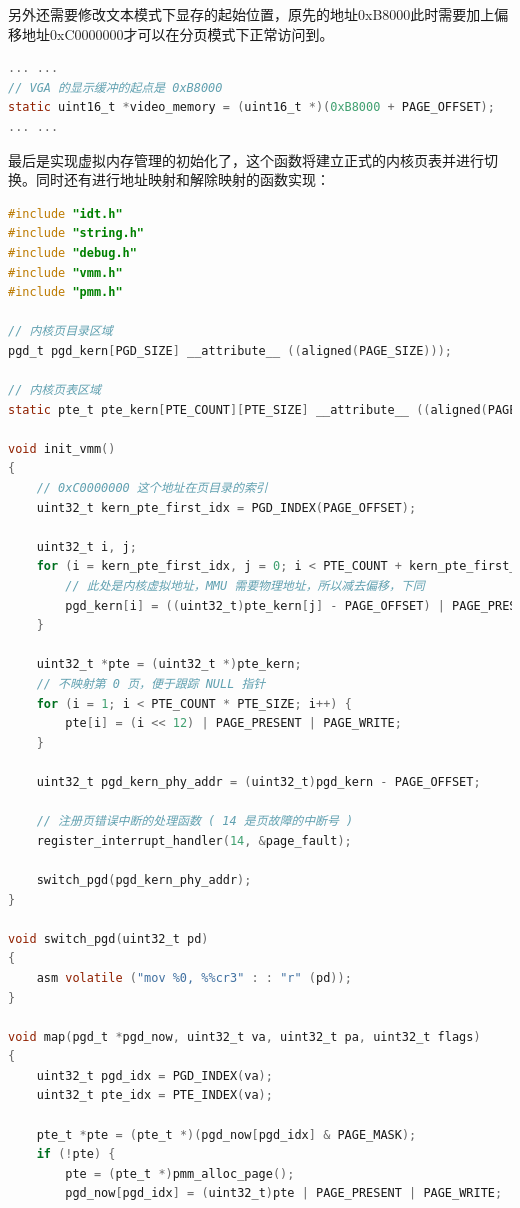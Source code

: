 \par 另外还需要修改文本模式下显存的起始位置，原先的地址0xB8000此时需要加上偏移地址0xC0000000才可以在分页模式下正常访问到。

\begin{lstlisting}[language = C, caption = drivers/console.c]
... ...
// VGA 的显示缓冲的起点是 0xB8000
static uint16_t *video_memory = (uint16_t *)(0xB8000 + PAGE_OFFSET);
... ...
\end{lstlisting}

\par 最后是实现虚拟内存管理的初始化了，这个函数将建立正式的内核页表并进行切换。同时还有进行地址映射和解除映射的函数实现：

\begin{lstlisting}[language = C, caption = mm/vmm.c]
#include "idt.h"
#include "string.h"
#include "debug.h"
#include "vmm.h"
#include "pmm.h"

// 内核页目录区域
pgd_t pgd_kern[PGD_SIZE] __attribute__ ((aligned(PAGE_SIZE)));

// 内核页表区域
static pte_t pte_kern[PTE_COUNT][PTE_SIZE] __attribute__ ((aligned(PAGE_SIZE)));

void init_vmm()
{
	// 0xC0000000 这个地址在页目录的索引
	uint32_t kern_pte_first_idx = PGD_INDEX(PAGE_OFFSET);
	
	uint32_t i, j;
	for (i = kern_pte_first_idx, j = 0; i < PTE_COUNT + kern_pte_first_idx; i++, j++) {
		// 此处是内核虚拟地址，MMU 需要物理地址，所以减去偏移，下同
		pgd_kern[i] = ((uint32_t)pte_kern[j] - PAGE_OFFSET) | PAGE_PRESENT | PAGE_WRITE;
	}

	uint32_t *pte = (uint32_t *)pte_kern;
	// 不映射第 0 页，便于跟踪 NULL 指针
	for (i = 1; i < PTE_COUNT * PTE_SIZE; i++) {
		pte[i] = (i << 12) | PAGE_PRESENT | PAGE_WRITE;
	}

	uint32_t pgd_kern_phy_addr = (uint32_t)pgd_kern - PAGE_OFFSET;

	// 注册页错误中断的处理函数 ( 14 是页故障的中断号 )
	register_interrupt_handler(14, &page_fault);

	switch_pgd(pgd_kern_phy_addr);
}

void switch_pgd(uint32_t pd)
{
	asm volatile ("mov %0, %%cr3" : : "r" (pd));
}

void map(pgd_t *pgd_now, uint32_t va, uint32_t pa, uint32_t flags)
{ 	
	uint32_t pgd_idx = PGD_INDEX(va);
	uint32_t pte_idx = PTE_INDEX(va); 
	
	pte_t *pte = (pte_t *)(pgd_now[pgd_idx] & PAGE_MASK);
	if (!pte) {
		pte = (pte_t *)pmm_alloc_page();
		pgd_now[pgd_idx] = (uint32_t)pte | PAGE_PRESENT | PAGE_WRITE;


\end{lstlisting}
